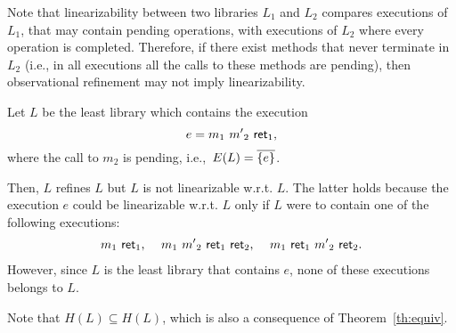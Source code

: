 Note that linearizability between two libraries $L_1$ and $L_2$ compares executions 
of $L_1$, that may contain pending operations, with executions of $L_2$ where every operation 
is completed. Therefore, if there exist methods that never terminate in $L_2$ (i.e., in all executions all the 
calls to these methods are pending), then 
observational refinement may not
imply linearizability. 

\begin{example}
Let $L$ be the least library which contains the execution 
\[
  e = {{m}_{1}}\ {{m'}_{2}}\ {\mathsf{ret}_{1}},
\] 
where the call to $m_2$ is pending, i.e.,~$E(L) = \overline{{{\{ e \}}}}$.

Then, $L$ refines $L$ but $L$ is not linearizable w.r.t. $L$. The latter holds
because the execution $e$ could be linearizable w.r.t. $L$ only if $L$ were to
contain one of the following executions:
\begin{align*}
  {\ensuremath{{m}_{1}}}\ {\mathsf{ret}_{1}} \text{, } \quad
  {\ensuremath{{m}_{1}}}\ {{m'}_{2}}\ {\mathsf{ret}_{1}}\ {\mathsf{ret}_{2}} \text{, } \quad
  {\ensuremath{{m}_{1}}}\ {\mathsf{ret}_{1}}\ {{m'}_{2}}\ {\mathsf{ret}_{2}} \text{.}
\end{align*}
However, since $L$ is the least library that contains $e$, none of these
executions belongs to $L$.

Note that $H(L)\subseteq H(L)$, which is also a consequence of Theorem~\ref{th:equiv}.
\end{example}

%

